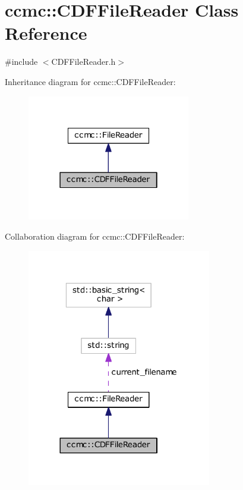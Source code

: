 \hypertarget{classccmc_1_1_c_d_f_file_reader}{\section{ccmc\-:\-:C\-D\-F\-File\-Reader Class Reference}
\label{classccmc_1_1_c_d_f_file_reader}
}


{\ttfamily \#include $<$C\-D\-F\-File\-Reader.\-h$>$}



Inheritance diagram for ccmc\-:\-:C\-D\-F\-File\-Reader\-:
\nopagebreak
\begin{figure}[H]
\begin{center}
\leavevmode
\includegraphics[width=202pt]{classccmc_1_1_c_d_f_file_reader__inherit__graph}
\end{center}
\end{figure}


Collaboration diagram for ccmc\-:\-:C\-D\-F\-File\-Reader\-:
\nopagebreak
\begin{figure}[H]
\begin{center}
\leavevmode
\includegraphics[width=228pt]{classccmc_1_1_c_d_f_file_reader__coll__graph}
\end{center}
\end{figure}
